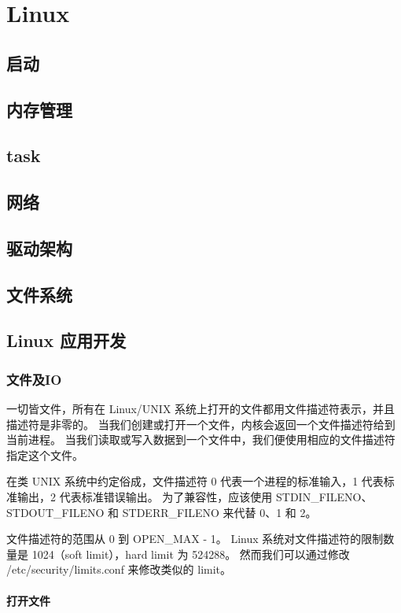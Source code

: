 \section{Linux}

\subsection{启动}
\subsection{内存管理}
\subsection{task}
\subsection{网络}
\subsection{驱动架构}
\subsection{文件系统}

\subsection{Linux 应用开发}

\subsubsection{文件及IO}

一切皆文件，所有在 Linux/UNIX 系统上打开的文件都用文件描述符表示，并且描述符是非零的。
当我们创建或打开一个文件，内核会返回一个文件描述符给到当前进程。
当我们读取或写入数据到一个文件中，我们便使用相应的文件描述符指定这个文件。

在类 UNIX 系统中约定俗成，文件描述符 0 代表一个进程的标准输入，1 代表标准输出，2 代表标准错误输出。
为了兼容性，应该使用 STDIN\_FILENO、STDOUT\_FILENO 和 STDERR\_FILENO 来代替 0、1 和 2。

文件描述符的范围从 0 到 OPEN\_MAX - 1。
Linux 系统对文件描述符的限制数量是 1024（soft limit），hard limit 为 524288。
然而我们可以通过修改 /etc/security/limits.conf 来修改类似的 limit。

\paragraph{打开文件}

